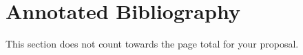 \documentclass[11pt]{article}
\begin{document}



\newpage

\onecolumn
\section*{Annotated Bibliography}\label{annon}

This section does not count towards the page total for your proposal.
\end{document}
